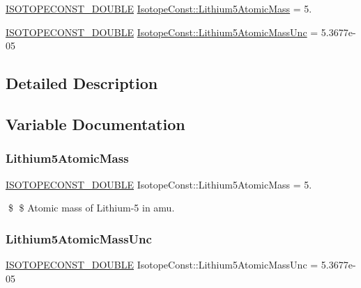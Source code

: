 \begin{DoxyCompactItemize}
\item 
\mbox{\hyperlink{group___isotope_const-_macros_ga8f45a7272ce02c0b4c65c44636ed719a}{I\+S\+O\+T\+O\+P\+E\+C\+O\+N\+S\+T\+\_\+\+D\+O\+U\+B\+LE}} \mbox{\hyperlink{group___isotope_const-_lithium-_li5_ga15ceafa78a26cd87a90e3616911cad29}{Isotope\+Const\+::\+Lithium5\+Atomic\+Mass}} = 5.
\item 
\mbox{\hyperlink{group___isotope_const-_macros_ga8f45a7272ce02c0b4c65c44636ed719a}{I\+S\+O\+T\+O\+P\+E\+C\+O\+N\+S\+T\+\_\+\+D\+O\+U\+B\+LE}} \mbox{\hyperlink{group___isotope_const-_lithium-_li5_gab29aeaa151c63e6d057b03a3555ad70c}{Isotope\+Const\+::\+Lithium5\+Atomic\+Mass\+Unc}} = 5.\+3677e-\/05
\end{DoxyCompactItemize}


\subsection{Detailed Description}


\subsection{Variable Documentation}
\mbox{\label{group___isotope_const-_lithium-_li5_ga15ceafa78a26cd87a90e3616911cad29}} 
\subsubsection{\texorpdfstring{Lithium5\+Atomic\+Mass}{Lithium5AtomicMass}}
{\footnotesize\ttfamily \mbox{\hyperlink{group___isotope_const-_macros_ga8f45a7272ce02c0b4c65c44636ed719a}{I\+S\+O\+T\+O\+P\+E\+C\+O\+N\+S\+T\+\_\+\+D\+O\+U\+B\+LE}} Isotope\+Const\+::\+Lithium5\+Atomic\+Mass = 5.}

\$ \$ Atomic mass of Lithium-\/5 in amu. \mbox{\label{group___isotope_const-_lithium-_li5_gab29aeaa151c63e6d057b03a3555ad70c}} 
\subsubsection{\texorpdfstring{Lithium5\+Atomic\+Mass\+Unc}{Lithium5AtomicMassUnc}}
{\footnotesize\ttfamily \mbox{\hyperlink{group___isotope_const-_macros_ga8f45a7272ce02c0b4c65c44636ed719a}{I\+S\+O\+T\+O\+P\+E\+C\+O\+N\+S\+T\+\_\+\+D\+O\+U\+B\+LE}} Isotope\+Const\+::\+Lithium5\+Atomic\+Mass\+Unc = 5.\+3677e-\/05}

